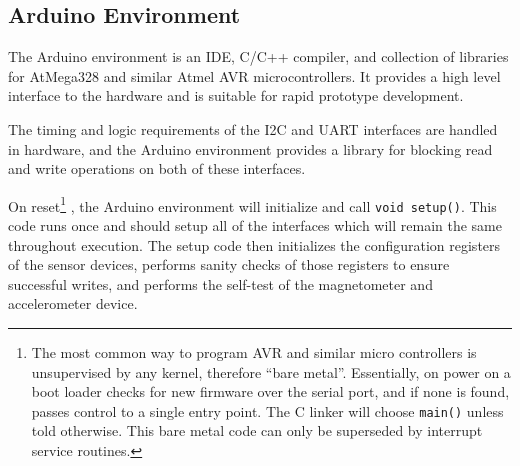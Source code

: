 \documentclass[12pt]{report}
\begin{document}
\subsection{Arduino Environment}
The Arduino environment is an IDE, C/C++ compiler, and collection of libraries for AtMega328 and similar Atmel AVR microcontrollers. It provides a high level interface to the hardware and is suitable for rapid prototype development. 

The timing and logic requirements of the I2C and UART interfaces are handled in hardware, and the Arduino environment provides a library for blocking read and write operations on both of these interfaces. 

On reset\footnote{The most common way to program AVR and similar micro controllers is unsupervised by any kernel, therefore ``bare metal''. Essentially, on power on a boot loader checks for new firmware over the serial port, and if none is found, passes control to a single entry point. The C linker will choose \lstinline$main()$ unless told otherwise. This bare metal code can only be superseded by interrupt service routines.}
, the Arduino environment will initialize and call \lstinline$void setup()$. This code runs once and should setup all of the interfaces which will remain the same throughout execution. The setup code then initializes the configuration registers of the sensor devices, performs sanity checks of those registers to ensure successful writes, and performs the self-test of the magnetometer and accelerometer device. 
\end{document}

